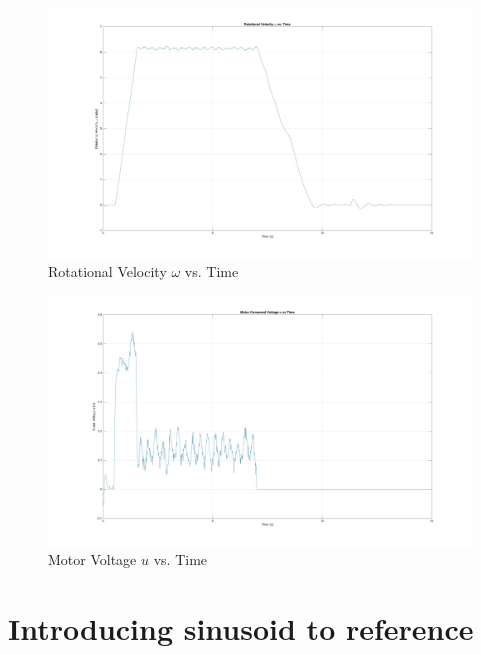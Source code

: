 \documentclass[11pt,titlepage]{article}
\begin{document}
        \begin{figure}[H]
            \centering
            \includegraphics[scale=0.1]{w_vs_time}
            \caption{Rotational Velocity $\omega$ vs. Time}
            \label{fig:w_vs_time}
        \end{figure}
        \begin{figure}[H]
            \centering
            \includegraphics[scale=0.1]{u_vs_time}
            \caption{Motor Voltage $u$ vs. Time}
            \label{fig:u_vs_time}
        \end{figure}
    
\section{Introducing sinusoid to reference}
\end{document}
